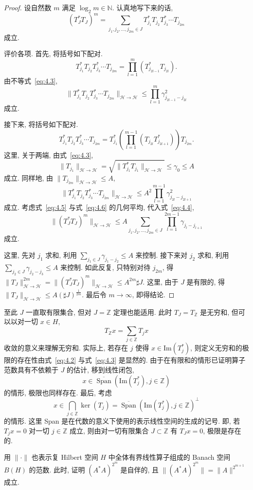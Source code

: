 \begin{proof}
设自然数 $m$ 满足 $\log_{2}m \in \mathbb{N}$. 认真地写下来的话,
\begin{equation}\tag{4.4}
(T_{J}^{*}T_{J})^{m} = \sum_{j_{1}, j_{2}, \ldots, j_{2m} \in J}T_{j_{1}}^{*}T_{j_{2}}T_{j_{3}}^{*} \cdots T_{j_{2m}}
\label{eq:4.4}
\end{equation}
成立.

评价各项. 首先, 将括号如下配对.
\[
T_{j_{1}}^{*}T_{j_{2}}T_{j_{3}}^{*} \cdots T_{j_{2m}} = \prod_{l=1}^{m}\left(T_{j_{2l-1}}^{*}T_{j_{2l}}\right).
\]
由不等式~\eqref{eq:4.3},
\begin{equation}\tag{4.5}
\|T_{j_{1}}^{*}T_{j_{2}}T_{j_{3}}^{*} \cdots T_{j_{2m}}\|_{\mathcal{H} \to \mathcal{H}} \leq \prod_{l=1}^{m}\gamma_{j_{2l-1}-j_{2l}}^{2}
\label{eq:4.5}
\end{equation}
成立.

接下来, 将括号如下配对.
\[
T_{j_{1}}^{*}T_{j_{2}}T_{j_{3}}^{*} \cdots T_{j_{2m}} = T_{j_{1}}^{*}\left(\prod_{l=1}^{m-1}\left(T_{j_{2l}}T_{j_{2l+1}}^{*}\right)\right)T_{j_{2m}}.
\]
这里, 关于两端, 由式~\eqref{eq:4.3},
\[
\|T_{j_{1}}\|_{\mathcal{H} \to \mathcal{H}} = \sqrt{\|T_{j_{1}}^{*}T_{j_{1}}\|_{\mathcal{H} \to \mathcal{H}}} \leq \gamma_{0} \leq A
\]
成立. 同样地, 由 $\|T_{j_{2m}}\|_{\mathcal{H} \to \mathcal{H}} \leq A$,
\begin{equation}\tag{4.6}
\|T_{j_{1}}^{*}T_{j_{2}}T_{j_{3}}^{*} \cdots T_{j_{2m}}\|_{\mathcal{H} \to \mathcal{H}} \leq A^{2}\prod_{l=1}^{m-1}\gamma_{j_{2l}-j_{2l+1}}^{2}
\label{eq:4.6}
\end{equation}
成立. 考虑式~\eqref{eq:4.5} 与式~\eqref{eq:4.6} 的几何平均, 代入式~\eqref{eq:4.4},
\[
\|(T_{J}^{*}T_{J})^{m}\|_{\mathcal{H} \to \mathcal{H}} \leq A\sum_{j_{1}, j_{2}, \ldots, j_{2m} \in J}\prod_{l=1}^{2m-1}\gamma_{j_{l}-j_{l+1}}
\]
成立.

这里, 先对 $j_{1}$ 求和, 利用 $\sum_{j_{1} \in J}\gamma_{j_{1}-j_{2}} \leq A$ 来控制. 接下来对 $j_{2}$ 求和, 利用 $\sum_{j_{2} \in J}\gamma_{j_{2}-j_{3}} \leq A$ 来控制. 如此反复, 只特别对待 $j_{2m}$, 得 $\|T_{J}\|_{\mathcal{H} \to \mathcal{H}}^{2m} = \|(T_{J}^{*}T_{J})^{m}\|_{\mathcal{H} \to \mathcal{H}} \leq A^{2m}\sharp J$. 这里, 由于 $J$ 是有限的, 得 $\|T_{J}\|_{\mathcal{H} \to \mathcal{H}} \leq A(\sharp J)^{\frac{1}{2m}}$. 最后令 $m \to \infty$, 即得结论.
\end{proof}

至此 $J$ 一直取有限集合, 但对 $J = \mathbb{Z}$ 定理也能适用. 此时 $T_{J} = T_{\mathbb{Z}}$ 是无穷和, 但可以以对一切 $x \in H$,
\[
T_{\mathbb{Z}}x = \sum_{j \in \mathbb{Z}}T_{j}x
\]
收敛的意义来理解无穷和. 实际上, 若存在 $j$ 使得 $x \in \mathrm{Im}(T_{j}^{*})$, 则定义无穷和的极限的存在性由式~\eqref{eq:4.2} 与式~\eqref{eq:4.3} 是显然的. 由于在有限和的情形已证明算子范数具有不依赖于 $J$ 的估计, 移到线性闭包,
\[
x \in \overline{\operatorname{Span}}\left(\mathrm{Im}(T_{j}^{*}), j \in \mathbb{Z}\right)
\]
的情形, 极限也同样存在. 最后, 考虑
\[
x \in \bigcap_{j \in \mathbb{Z}}\ker(T_{j}) = \overline{\operatorname{Span}}\left(\mathrm{Im}(T_{j}^{*}), j \in \mathbb{Z}\right)^{\perp}
\]
的情形. 这里 Span 是在代数的意义下使用的表示线性空间的生成的记号. 即, 若 $T_{j}x = 0$ 对一切 $j \in \mathbb{Z}$ 成立, 则由对一切有限集合 $J \subset \mathbb{Z}$ 有 $T_{J}x = 0$, 极限是存在的.

\begin{exercise}\label{exer:4.1}
用 $\|\cdot\|$ 也表示复 Hilbert 空间 $H$ 中全体有界线性算子组成的 Banach 空间 $B(H)$ 的范数. 此时, 证明 $(A^{*}A)^{2^{m}}$ 是自伴的, 且 $\|(A^{*}A)^{2^{m}}\| = \|A\|^{2^{m+1}}$ 成立.
\end{exercise}
